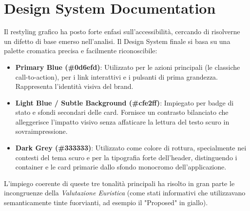 \section{Design System Documentation}
Il restyling grafico ha posto forte enfasi sull'accessibilità, cercando di risolverne un difetto di base emerso nell'analisi. Il Design System finale si basa su una palette cromatica precisa e facilmente riconoscibile:
\begin{itemize}
    \item \textbf{Primary Blue (\#0d6efd)}: Utilizzato per le azioni principali (le classiche call-to-action), per i link interattivi e i pulsanti di prima grandezza. Rappresenta l'identità visiva del brand.
    \item \textbf{Light Blue / Subtle Background (\#cfe2ff)}: Impiegato per badge di stato e sfondi secondari delle card. Fornisce un contrasto bilanciato che alleggerisce l'impatto visivo senza affaticare la lettura del testo scuro in sovraimpressione.
    \item \textbf{Dark Grey (\#333333)}: Utilizzato come colore di rottura, specialmente nei contesti del tema scuro e per la tipografia forte dell'header, distinguendo i container e le card primarie dallo sfondo monocromo dell'applicazione.
\end{itemize}
L'impiego coerente di queste tre tonalità principali ha risolto in gran parte le incongruenze della \textit{Valutazione Euristica} (come stati informativi che utilizzavano semanticamente tinte fuorvianti, ad esempio il "Proposed" in giallo).

